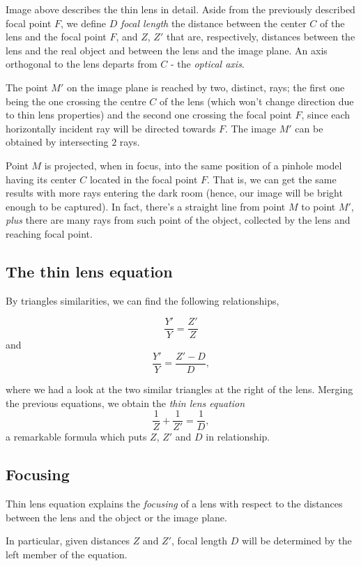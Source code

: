 \documentclass[10pt]{report}
\begin{document}
Image above describes the thin lens in detail. Aside from the previously
described focal point \(F\), we define \(D\) \emph{focal length} the distance
between the center \(C\) of the lens and the focal point \(F\), and
\(Z\), \(Z'\) that are, respectively, distances between the lens and the
real object and between the lens and the image plane. An axis orthogonal
to the lens departs from \(C\) - the \emph{optical axis}.

The point \(M'\) on the image plane is reached by two, distinct, rays;
the first one being the one crossing the centre \(C\) of the lens (which
won't change direction due to thin lens properties) and the second one
crossing the focal point \(F\), since each horizontally incident ray
will be directed towards \(F\). The image \(M'\) can be obtained by
intersecting \(2\) rays.

Point \(M\) is projected, when in focus, into the same position of a
pinhole model having its center \(C\) located in the focal point \(F\).
That is, we can get the same results with more rays entering the dark
room (hence, our image will be bright enough to be captured). In fact,
there's a straight line from point \(M\) to point \(M'\), \emph{plus} there
are many rays from such point of the object, collected by the lens and
reaching focal point.

\subsection{The thin lens equation}
\label{the-thin-lens-equation}
By triangles similarities, we can find the following relationships,

\[ \frac{Y'}{Y} = \frac{Z'}{Z} \] and
\[ \frac{Y'}{Y} = \frac{Z' - D}{D}, \]

where we had a look at the two similar triangles at the right of the
lens. Merging the previous equations, we obtain the \emph{thin lens equation}
\[ \frac{1}{Z} + \frac{1}{Z'} = \frac{1}{D}, \] a remarkable formula
which puts \(Z\), \(Z'\) and \(D\) in relationship.

\subsection{Focusing}
\label{focusing}
Thin lens equation explains the \emph{focusing} of a lens with respect to the
distances between the lens and the object or the image plane.

In particular, given distances \(Z\) and \(Z'\), focal length \(D\) will
be determined by the left member of the equation.
\end{document}
